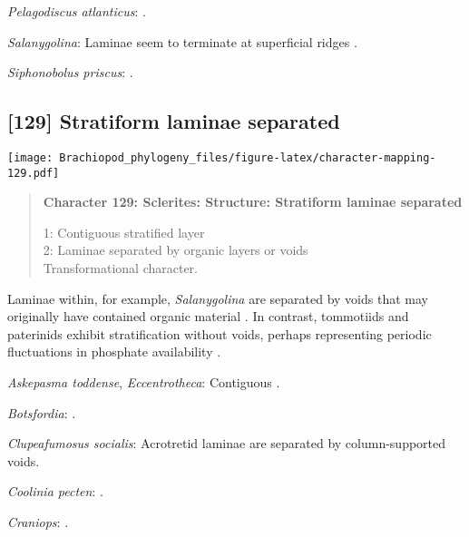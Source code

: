 \documentclass[openany]{book}
\theoremstyle{definition}
\theoremstyle{definition}
\theoremstyle{definition}
\theoremstyle{remark}
\begin{document}
\hypertarget{Pelagodiscus_atlanticus-coding-128}{}
\emph{Pelagodiscus atlanticus}: \citet{Williams1998Chemicostructural}.

\hypertarget{Salanygolina-coding-128}{}
\emph{Salanygolina}: Laminae seem to terminate at superficial ridges
\citep{Holmer2009Theenigmatic}.

\hypertarget{Siphonobolus_priscus-coding-128}{}
\emph{Siphonobolus priscus}: \citep{Williams2004Chemicostructure}.

\subsection*{{[}129{]} Stratiform laminae
separated}\label{stratiform-laminae-separated}

\texttt{[image: Brachiopod\_phylogeny\_files/figure-latex/character-mapping-129.pdf]}

\begin{quote}
\textbf{Character 129: Sclerites: Structure: Stratiform laminae
separated}

1: Contiguous stratified layer\\
2: Laminae separated by organic layers or voids\\
Transformational character.
\end{quote}

Laminae within, for example, \emph{Salanygolina} are separated by voids
that may originally have contained organic material
\citep[e.g.][]{Holmer2009Theenigmatic}. In contrast, tommotiids and
paterinids exhibit stratification without voids, perhaps representing
periodic fluctuations in phosphate availability
\citep{Balthasar2009Homologousskeletal}.

\hypertarget{Askepasma_toddense-coding-129}{}
\emph{Askepasma toddense}, \emph{Eccentrotheca}: Contiguous
\citep{Balthasar2009Homologousskeletal}.

\hypertarget{Botsfordia-coding-129}{}
\emph{Botsfordia}: \citet{Skovsted2003EarlyCambrian}.

\hypertarget{Clupeafumosus_socialis-coding-129}{}
\emph{Clupeafumosus socialis}: Acrotretid laminae are separated by
column-supported voids.

\hypertarget{Coolinia_pecten-coding-129}{}
\emph{Coolinia pecten}: \citet{Dewing2004}.

\hypertarget{Craniops-coding-129}{}
\emph{Craniops}: \citep[fig. 249.1]{Williams1997Introduction}.
\end{document}
